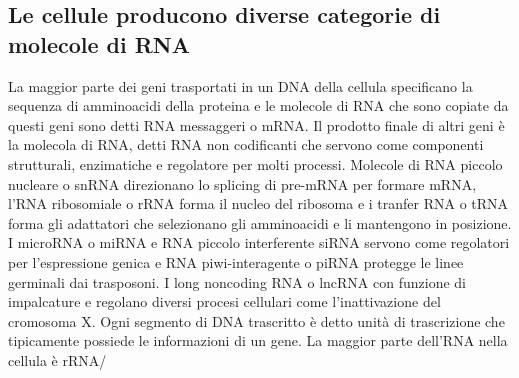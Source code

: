 \subsection{Le cellule producono diverse categorie di molecole di RNA}
La maggior parte dei geni trasportati in un DNA della cellula specificano la sequenza di amminoacidi della proteina e le molecole di RNA che sono copiate da questi geni sono detti RNA
messaggeri o mRNA. Il prodotto finale di altri geni \`e la molecola di RNA, detti RNA non codificanti che servono come componenti strutturali, enzimatiche e regolatore per molti 
processi. Molecole di RNA piccolo nucleare o snRNA direzionano lo splicing di pre-mRNA per formare mRNA, l'RNA ribosomiale o rRNA forma il nucleo del ribosoma e i tranfer RNA o tRNA
forma gli adattatori che selezionano gli amminoacidi e li mantengono in posizione. I microRNA o miRNA e RNA piccolo interferente siRNA servono come regolatori per l'espressione genica e 
RNA piwi-interagente o piRNA protegge le linee germinali dai trasposoni. I long noncoding RNA o lncRNA con funzione di impalcature e regolano diversi procesi cellulari come
l'inattivazione del cromosoma X. Ogni segmento di DNA trascritto \`e detto unit\`a di trascrizione che tipicamente possiede le informazioni di un gene. La maggior parte dell'RNA nella
cellula \`e rRNA/

